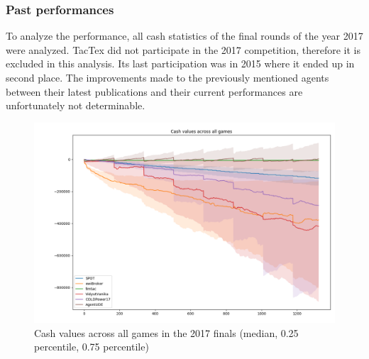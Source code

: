 \subsubsection{Past performances}%
\label{ssub:past_performances}

To analyze the performance, all cash statistics of the final rounds of the year 2017 were analyzed. TacTex did not
participate in the 2017 competition, therefore it is excluded in this analysis. Its last participation was in 2015
where it ended up in second place. The improvements made to the previously mentioned agents between their latest
publications and their current performances are unfortunately not determinable.
\begin{figure}[]
    \centering
    \includegraphics[width=1.0\linewidth]{img/cash_vals_across_games.png}
    \caption{Cash values across all games in the 2017 finals (median, 0.25 percentile, 0.75 percentile)}
    \label{fig:cash_vals_across_games}
\end{figure}

